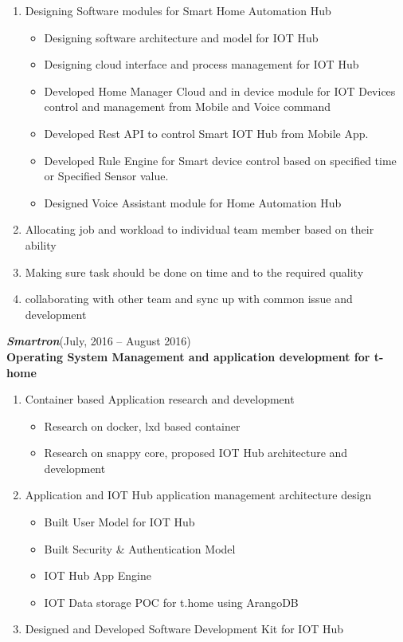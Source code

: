 \documentclass[a4paper,margin,line]{resume}
\begin{document}
\begin{resume}
	\begin{enumerate}
   		\item Designing Software modules for Smart Home Automation Hub
   		\begin{itemize}
     			\item Designing software architecture and model for IOT Hub 
     			\item Designing  cloud interface and process management for IOT Hub
     			\item Developed Home Manager Cloud and in device module for IOT Devices control and management from Mobile and Voice command 
     			\item Developed Rest API to control Smart IOT Hub from Mobile App. 
     			\item Developed Rule Engine for Smart device control based on specified time or Specified Sensor value.
     			\item Designed Voice Assistant module for Home Automation Hub
  		 \end{itemize}
   		\item Allocating job and workload to individual team member based on their ability 
   		\item Making sure task should be done on time and to the required quality 
   		\item collaborating with other team and sync up with common issue and development
	\end{enumerate}


	\textsl{\textbf{Smartron}}\hfill(July, 2016 -- August 2016)\vspace{1mm}\\%
	\textbf{Operating System Management and application development for t-home}\vspace{0.5mm}\\%

	\begin{enumerate}
   		\item Container based Application research and development
   		\begin{itemize}
     			\item Research on docker, lxd based container
     			\item Research on snappy core, proposed IOT Hub architecture and development  
  		 \end{itemize}
   		\item Application and IOT Hub application management architecture design 
  		 \begin{itemize}
   			\item Built User Model for IOT Hub
   			\item Built Security \& Authentication Model
  			 \item IOT Hub App Engine
  			 \item IOT Data storage POC  for t.home using ArangoDB
   		\end{itemize}
   		\item Designed and Developed Software Development Kit for IOT Hub
	\end{enumerate}


\end{resume}
\end{document}
